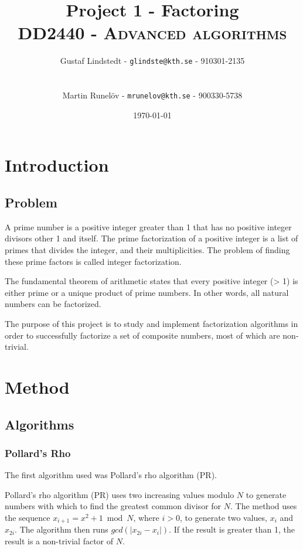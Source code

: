 \documentclass[paper=a4, fontsize=11pt,numbers=endperiod]{scrartcl} %
\title{	
\huge Project 1 - Factoring \\ %
\vspace{10pt}
\normalfont \normalsize 
\textsc{DD2440 - Advanced algorithms } \\ [25pt] %
}
\author{\vspace{-20pt} Gustaf Lindstedt - \nolinkurl{glindste@kth.se} - 910301-2135\\\\\\Martin Runelöv - \nolinkurl{mrunelov@kth.se} - 900330-5738}
\date{\vspace{8pt}\normalsize\today} %
\providecommand{\abs}[1]{\lvert#1\rvert} %
\numberwithin{equation}{section} %
\numberwithin{figure}{section} %
\numberwithin{table}{section} %
\begin{document}
\maketitle %


\section{Introduction}

\subsection{Problem}
A prime number is a positive integer greater than 1 that has no positive integer divisors other 1 and itself. The prime factorization of a positive integer is a list of primes that divides the integer, and their multiplicities. The problem of finding these prime factors is called integer factorization.

The fundamental theorem of arithmetic states that every positive integer (> 1) is either prime or a unique product of prime numbers. In other words, all natural numbers can be factorized.

The purpose of this project is to study and implement factorization algorithms in order to successfully factorize a set of composite numbers, most of which are non-trivial.



\section{Method}
\subsection{Algorithms}
\subsubsection{Pollard's Rho}
The first algorithm used was Pollard's rho algorithm (PR).

Pollard's rho algorithm (PR) \cite{pollard} uses two increasing values modulo $N$ to generate numbers with which to find the greatest common divisor for $N$.
The method uses the sequence $x_{i+1} = x^2 + 1 \bmod N$, where $i > 0$, to generate two values, $x_i$ and $x_{2i}$.
The algorithm then runs $gcd(\abs{x_{2i}-x_i})$. If the result is greater than 1, the result is a non-trivial factor of $N$.
\\
\end{document}
